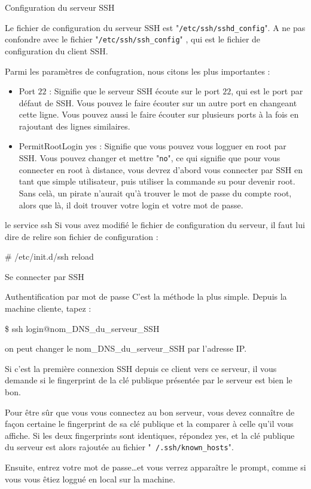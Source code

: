 \documentclass[10pt]{beamer}
\begin{document}
\begin{frame}{Configuration du serveur SSH}

Le fichier de configuration du serveur SSH est "\texttt{/etc/ssh/sshd\_config}". A ne pas
confondre avec le fichier "\texttt{/etc/ssh/ssh\_config}" , qui est le fichier de configuration du
client SSH.
\pause


Parmi les paramètres de confugration, nous citons les plus importantes :
\begin{itemize}
\item \alert{Port} $22$ : Signifie que le serveur SSH écoute sur le port $22$, qui est le port
par défaut de SSH. Vous pouvez le faire écouter sur un autre port en changeant cette ligne. Vous pouvez aussi le faire écouter sur plusieurs ports à la fois en rajoutant des lignes similaires.
\item \alert{PermitRootLogin} yes : Signifie que vous pouvez vous logguer en root par
SSH. Vous pouvez changer et mettre "\texttt{no}", ce qui signifie que pour vous
connecter en root à distance, vous devrez d'abord vous connecter par SSH
en tant que simple utilisateur, puis utiliser la commande su pour devenir
root. Sans celà, un pirate n'aurait qu'à trouver le mot de passe du compte
root, alors que là, il doit trouver votre login et votre mot de passe.
\end{itemize}

\end{frame}
\begin{frame}{le service ssh}
Si vous avez modifié le fichier de configuration du serveur, il faut lui dire de relire
son fichier de configuration :

\# \alert{/etc/init.d/ssh} reload

\end{frame}

\begin{frame}{Se connecter par SSH}
\begin{alertblock}{Authentification par mot de passe}
C'est la méthode la plus simple. Depuis la machine cliente, tapez :


\$ \alert{ssh} login@nom\_DNS\_du\_serveur\_SSH

on peut changer le nom\_DNS\_du\_serveur\_SSH  par l'adresse IP.


Si c'est la première connexion SSH depuis ce client vers ce serveur, il vous demande si le fingerprint de la clé publique présentée par le serveur est bien le bon. 

Pour être sûr que vous vous connectez au bon serveur, vous devez connaître de façon certaine le fingerprint de sa clé publique et la comparer à celle qu'il vous affiche. Si les deux fingerprints sont identiques, répondez yes, et la clé publique du serveur est alors rajoutée au fichier "\texttt{~/.ssh/known\_hosts}".
\pause

Ensuite, entrez votre mot de passe\ldots et vous verrez apparaître le prompt, comme si vous vous êtiez loggué en local sur la machine.
\end{alertblock}
\end{frame}
\end{document}
